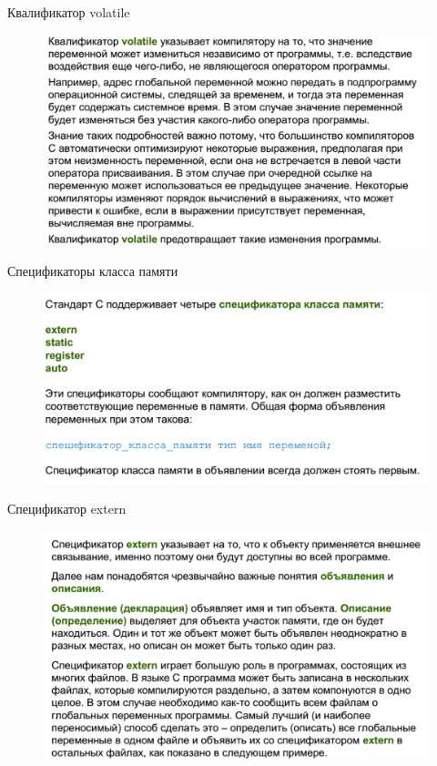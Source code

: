 \documentclass{beamer}
\begin{document}
\begin{frame}{Квалификатор volatile}
\begin{figure}[h]
\centering
\includegraphics[scale=0.4]{images/lec02-pic08.png}
\end{figure}
\end{frame}

\begin{frame}{Спецификаторы класса памяти}
\begin{figure}[h]
\centering
\includegraphics[scale=0.4]{images/lec02-pic09.png}
\end{figure}
\end{frame}

\begin{frame}{Спецификатор extern}
\begin{figure}[h]
\centering
\includegraphics[scale=0.4]{images/lec02-pic10.png}
\end{figure}
\end{frame}
\end{document}
